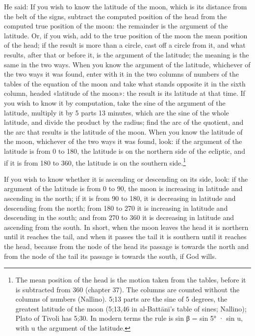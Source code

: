 \documentclass[11pt]{article}
\newcommand{\ArPage}[1]{\marginpar{\footnotesize\color{gray}Ar.\,p.\,#1}}
\begin{document}
\par \ArPage{114}He said: If you wish to know the latitude of the moon, which is its distance from the belt of the signs, subtract the computed position of the head from the computed true position of the moon: the remainder is the argument of the latitude. Or, if you wish, add to the true position of the moon the mean position of the head; if the result is more than a circle, cast off a circle from it, and what results, after that or before it, is the argument of the latitude; the meaning is the same in the two ways. When you know the argument of the latitude, whichever of the two ways it was found, enter with it in the two columns of numbers of the tables of the equation of the moon and take what stands opposite it in the sixth column, headed «latitude of the moon»: the result is its latitude at that time. If you wish to know it by computation, take the sine of the argument of the latitude, multiply it by 5 parts 13 minutes, which are the sine of the whole latitude, and divide the product by the radius; find the arc of the quotient, and the arc that results is the latitude of the moon. When you know the latitude of the moon, whichever of the two ways it was found, look: if the argument of the latitude is from 0 to 180, the latitude is on the northern side of the ecliptic, and if it is from 180 to 360, the latitude is on the southern side.\footnote{The mean position of the head is the motion taken from the tables, before it is subtracted from 360 (chapter 37). The columns are counted without the columns of numbers (Nallino). 5;13 parts are the sine of 5 degrees, the greatest latitude of the moon (5;13,46 in al-Battānī's table of sines; Nallino); Plato of Tivoli has 5;30. In modern terms the rule is sin β = sin 5° · sin u, with u the argument of the latitude.}\par
\par If you wish to know whether it is ascending or descending on its side, look: if the argument of the latitude is from 0 to 90, the moon is increasing in latitude and ascending in the north; if it is from 90 to 180, it is decreasing in latitude and descending from the north; from 180 to 270 it is increasing in latitude and descending in the south; and from 270 to 360 it is decreasing in latitude and ascending from the south. In short, when the moon leaves the head it is northern until it reaches the tail, and when it passes the tail it is southern until it reaches the head, because from the node of the head its passage is towards the north and from the node of the tail its passage is towards the south, if God wills.\par
\end{document}
